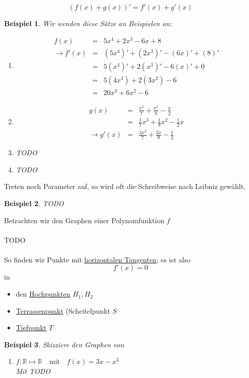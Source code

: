 \documentclass{report}
\newtheorem{myexample}{Beispiel}
\begin{document}
\begin{equation}(f(x) + g(x))' = f'(x) + g'(x)\end{equation}
\begin{myexample}Wir wenden diese Sätze an Beispielen an:
\begin{enumerate}
\item \begin{eqnarray}f(x) & = & 5x^4 + 2x^3 - 6x + 8 \nonumber \\
\to f'(x) & = & (5x^4)' + (2x^3)' - (6x)' + (8)' \nonumber \\
& = & 5(x^4)' + 2(x^3)' - 6(x)' + 0 \nonumber \\
& = & 5(4x^3) + 2(3x^2) - 6 \nonumber \\
& = & 20x^3 + 6x^2 - 6\end{eqnarray}
\item \begin{eqnarray}g(x) & = & \frac{x^3}{7} + \frac{x^2}{9} - \frac{x}{2} \nonumber \\
& = & \frac{1}{7}x^3 + \frac{1}{9}x^2 - \frac{1}{2}x \nonumber \\
\to g'(x) & = & \frac{3x^2}{7} + \frac{2x}{9} - \frac{1}{2}\end{eqnarray}
\item TODO
\item TODO
\end{enumerate}\end{myexample}
Treten noch Parameter auf, so wird oft die Schreibweise nach Leibniz gewählt.
\begin{myexample}TODO\end{myexample}
Betrachten wir den Graphen einer Polynomfunktion $f$
\\\\TODO\\\\
So finden wir Punkte mit \underline{horizontalen Tangenten}; es ist also
\begin{equation}f'(x)=0\end{equation}
in
\begin{itemize}
\item den \underline{Hochpunkten} $H_1, H_2$
\item \underline{Terrassenpunkt} (Scheitelpunkt $S$
\item \underline{Tiefpunkt} $T$\end{itemize}
\begin{myexample}Skizziere den Graphen von
\begin{enumerate}
\item $f: \mathbb{R} \mapsto \mathbb{R} \quad \mbox{mit} \quad f(x) = 3x-x^3$\\
Mit TODO\end{enumerate}
\end{myexample}
\end{document}
